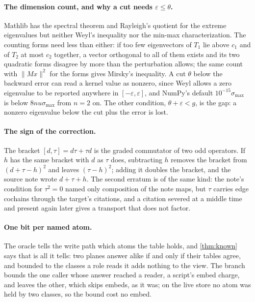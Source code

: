 \documentclass[11pt]{article}
\theoremstyle{plain}
\theoremstyle{definition}
\theoremstyle{remark}
\newcommand{\norm}[1]{\lVert #1 \rVert}
\begin{document}
\paragraph{The dimension count, and why a cut needs $\varepsilon \le \theta$.} Mathlib has the
spectral theorem and Rayleigh's quotient for the extreme eigenvalues but neither Weyl's inequality
nor the min-max characterization. The counting forms need less than either: if too few
eigenvectors of $T_1$ lie above $c_1$ and of $T_2$ at most $c_2$ together, a vector orthogonal to
all of them exists and its two quadratic forms disagree by more than the perturbation allows; the
same count with $\norm{Mx}^2$ for the forms gives Mirsky's inequality. A cut $\theta$ below the
backward error can read a kernel value as nonzero, since Weyl allows a zero eigenvalue to be
reported anywhere in $[-\varepsilon, \varepsilon]$, and NumPy's default $10^{-15}\sigma_{\max}$ is
below $8nu\sigma_{\max}$ from $n = 2$ on. The other condition, $\theta + \varepsilon < g$, is the
gap: a nonzero eigenvalue below the cut plus the error is lost.

\paragraph{The sign of the correction.} The bracket $[d, \tau] = d\tau + \tau d$ is the graded
commutator of two odd operators. If $h$ has the same bracket with $d$ as $\tau$ does, subtracting
$h$ removes the bracket from $(d + \tau - h)^2$ and leaves $(\tau - h)^2$; adding it doubles the
bracket, and the source note wrote $d + \tau + h$. The second erratum is of the same kind: the
note's condition for $\tau^2 = 0$ named only composition of the note maps, but $\tau$ carries
edge cochains through the target's citations, and a citation severed at a middle time and present
again later gives a transport that does not factor.

\paragraph{One bit per named atom.} The oracle tells the write path which atoms the table holds,
and \cref{thm:known} says that is all it tells: two planes answer alike if and only if their
tables agree, and bounded to the classes a role reads it adds nothing to the view. The branch
bounds the one caller whose answer reached a reader, a script's embed charge, and leaves the
other, which skips embeds, as it was; on the live store no atom was held by two classes, so the
bound cost no embed.
\end{document}

